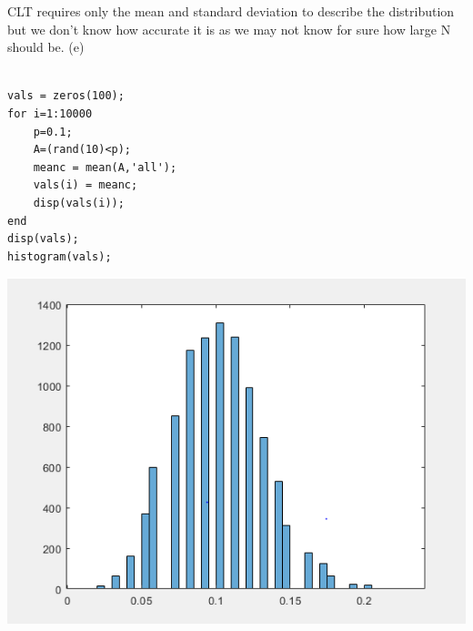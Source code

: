 \documentclass[11pt]{article} %
\begin{document}
CLT requires only the mean and standard deviation to describe the distribution but we don't know how accurate it is as we may not know for sure how large N should be.
\newline
(e)
\begin{verbatim}

vals = zeros(100);
for i=1:10000
    p=0.1;
    A=(rand(10)<p);
    meanc = mean(A,'all');
    vals(i) = meanc;
    disp(vals(i));
end
disp(vals);
histogram(vals);

\end{verbatim}
\includegraphics{2.png}
\end{document}
